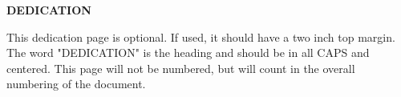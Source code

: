 \thispagestyle{empty}

\begin{center}
\textbf{DEDICATION}
\end{center}

\smallskip

This dedication page is optional. If used, it should have a two inch top margin. The word "DEDICATION" is the heading and should be in all CAPS and centered. This page will not be numbered, but will count in the overall numbering of the document.

